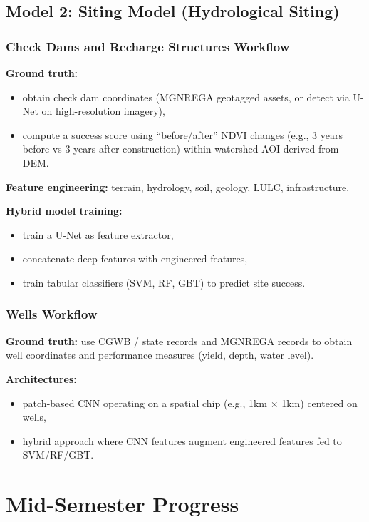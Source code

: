 \documentclass[12pt,a4paper]{report}
\begin{document}
\section{Model 2: Siting Model (Hydrological Siting)}
\subsection{Check Dams and Recharge Structures Workflow}
\textbf{Ground truth:}
\begin{itemize}
  \item obtain check dam coordinates (MGNREGA geotagged assets, or detect via U-Net on high-resolution imagery),
  \item compute a success score using “before/after” NDVI changes (e.g., 3 years before vs 3 years after construction) within watershed AOI derived from DEM.
\end{itemize}

\textbf{Feature engineering:} terrain, hydrology, soil, geology, LULC, infrastructure.

\textbf{Hybrid model training:}
\begin{itemize}
  \item train a U-Net as feature extractor,
  \item concatenate deep features with engineered features,
  \item train tabular classifiers (SVM, RF, GBT) to predict site success.
\end{itemize}

\subsection{Wells Workflow}
\textbf{Ground truth:} use CGWB / state records and MGNREGA records to obtain well coordinates and performance measures (yield, depth, water level).

\textbf{Architectures:}
\begin{itemize}
  \item patch-based CNN operating on a spatial chip (e.g., 1km $\times$ 1km) centered on wells,
  \item hybrid approach where CNN features augment engineered features fed to SVM/RF/GBT.
\end{itemize}

\chapter{Mid-Semester Progress}
\end{document}
